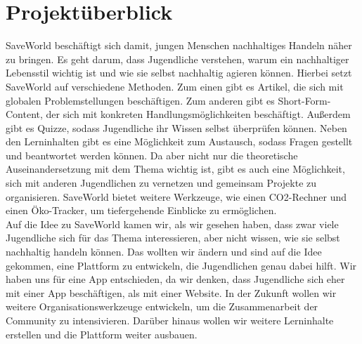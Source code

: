\documentclass[../main.tex]{subfiles}
\begin{document}
    \chapter*{Projektüberblick}
    \thispagestyle{empty}

    SaveWorld beschäftigt sich damit, jungen Menschen nachhaltiges Handeln näher zu bringen.
    Es geht darum, dass Jugendliche verstehen, warum ein nachhaltiger Lebensstil wichtig ist und wie sie selbst nachhaltig agieren können.
    Hierbei setzt SaveWorld auf verschiedene Methoden.
    Zum einen gibt es Artikel, die sich mit globalen Problemstellungen beschäftigen.
    Zum anderen gibt es Short-Form-Content, der sich mit konkreten Handlungsmöglichkeiten beschäftigt.
    Außerdem gibt es Quizze, sodass Jugendliche ihr Wissen selbst überprüfen können.
    Neben den Lerninhalten gibt es eine Möglichkeit zum Austausch, sodass Fragen gestellt und beantwortet werden können.
    Da aber nicht nur die theoretische Auseinandersetzung mit dem Thema wichtig ist, gibt es auch eine Möglichkeit, sich mit anderen Jugendlichen zu vernetzen und gemeinsam Projekte zu organisieren.
    SaveWorld bietet weitere Werkzeuge, wie einen CO2-Rechner und einen Öko-Tracker, um tiefergehende Einblicke zu ermöglichen. \\
    Auf die Idee zu SaveWorld kamen wir, als wir gesehen haben, dass zwar viele Jugendliche sich für das Thema interessieren, aber nicht wissen, wie sie selbst nachhaltig handeln können.
    Das wollten wir ändern und sind auf die Idee gekommen, eine Plattform zu entwickeln, die Jugendlichen genau dabei hilft.
    Wir haben uns für eine App entschieden, da wir denken, dass Jugendliche sich eher mit einer App beschäftigen, als mit einer Website.
    In der Zukunft wollen wir weitere Organisationswerkzeuge entwickeln, um die Zusammenarbeit der Community zu intensivieren.
    Darüber hinaus wollen wir weitere Lerninhalte erstellen und die Plattform weiter ausbauen.
\end{document}
